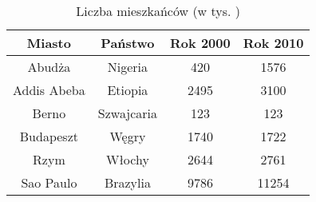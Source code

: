 \begin{table}[htbp]
\centering
\begin{tabular}{||c c c c||} 
 \hline
 Miasto & Państwo & Rok 2000 & Rok 2010 \\ [0.5ex] 
 \hline\hline
 Abudża & Nigeria & 420 & 1576 \\ 
 \hline
 Addis Abeba & Etiopia & 2495 & 3100 \\
 \hline
 Berno & Szwajcaria & 123 & 123 \\
 \hline
 Budapeszt & Węgry & 1740 & 1722 \\
 \hline
 Rzym & Włochy & 2644 & 2761 \\
 \hline
 Sao Paulo & Brazylia & 9786 & 11254 \\
 \hline
\end{tabular}
\label{tab:liczba ludności}
\caption{Liczba mieszkańców (w tys. )}
\end{table}